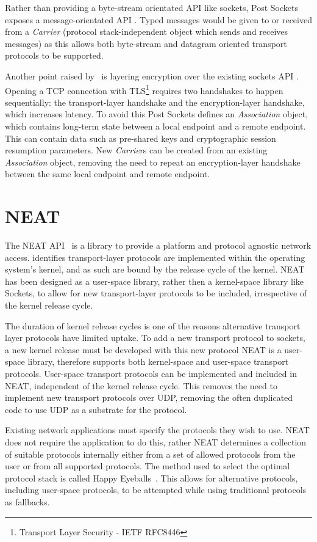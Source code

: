Rather than providing a byte-stream orientated API like sockets, Post Sockets exposes a message-orientated API .
Typed messages would be given to or received from a \emph{Carrier} (protocol stack-independent object which sends and
receives messages) as this allows both byte-stream and datagram oriented transport protocols to be supported.

Another point raised by~\cite{kuhlewind_postsocketsabstract_} is layering encryption over the existing sockets API .
Opening a TCP connection with
TLS\footnote{Transport Layer Security - IETF RFC8446} requires two handshakes to happen sequentially: the
transport-layer handshake and the encryption-layer handshake, which increases latency.
To avoid this Post Sockets defines an \emph{Association} object, which contains long-term state between a local endpoint
and a remote endpoint.
This can contain data such as pre-shared keys and cryptographic session resumption parameters.
New \emph{Carrier}s can be created from an existing \emph{Association} object, removing the need to repeat an
encryption-layer handshake between the same local endpoint and remote endpoint.

\section{NEAT}\label{sec:neat}
The NEAT API~\citep{khademi_neatplatformprotocolindependent_2017} is a library to provide a platform and protocol
agnostic network access.
\citet{khademi_neatplatformprotocolindependent_2017} identifies transport-layer protocols are implemented within the
operating system's kernel, and as such are bound by the release cycle of the kernel.
NEAT has been designed as a user-space library, rather then a kernel-space library like Sockets, to allow for new
transport-layer protocols to be included, irrespective of the kernel release cycle.

The duration of kernel release cycles is one of the reasons alternative transport layer protocols have limited uptake.
To add a new transport protocol to sockets, a new kernel release must be developed with this new protocol
NEAT is a user-space library, therefore supports both kernel-space and user-space transport protocols.
User-space transport protocols can be implemented and included in NEAT, independent of the kernel release cycle.
This removes the need to implement new transport protocols over UDP,
removing the often duplicated code to use UDP as a substrate for the protocol.

Existing network applications must specify the protocols they wish to use.
NEAT does not require the application to do this, rather NEAT determines a collection of suitable protocols internally
either from a set of allowed protocols from the user or from all supported protocols.
The method used to select the optimal protocol stack is called Happy Eyeballs~\citep{pauly_happyeyeballsversion_}.
This allows for alternative protocols, including user-space protocols, to be attempted while using traditional protocols
as fallbacks.


